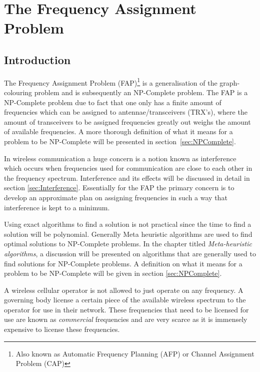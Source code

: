 \chapter{The Frequency Assignment Problem}
\label{chpt:fap}
\section{Introduction}
The Frequency Assignment Problem (FAP)\footnote{Also known as Automatic Frequency Planning (AFP) or Channel Assignment Problem (CAP)\cite{ACOvsEA}} is a generalisation of the graph-colouring problem and is subsequently an NP-Complete problem\cite{FAPRAMColouring}. The FAP is a NP-Complete problem due to fact that one only has a finite amount of frequencies which can be assigned to antennae/transceivers (TRX's), where the amount of transceivers to be assigned frequencies greatly out weighs the amount of available frequencies\cite{FAPRAMColouring}. A more thorough definition of what it means for a problem to be NP-Complete will be presented in section~\ref{sec:NPComplete}.

In wireless communication a huge concern is a notion known as interference which occurs when frequencies used for communication are close to each other in the frequency spectrum\cite{Karen2004}. Interference and its effects will be discussed in detail in section \ref{sec:Interference}. Essentially for the FAP the primary concern is to develop an approximate plan on assigning frequencies in such a way that interference is kept to a minimum. 

Using exact algorithms to find a solution is not practical since the time to find a solution will be polynomial. Generally Meta heuristic algorithms are used to find optimal solutions to NP-Complete problems\cite{ACOvsEA}. In the chapter titled \emph{Meta-heuristic algorithms}, a discussion will be presented on algorithms that are generally used to find solutions for NP-Complete problems. A definition on what it means for a problem to be NP-Complete will be given in section \ref{sec:NPComplete}. 

A wireless cellular operator is not allowed to just operate on any frequency. A governing body license a certain piece of the available wireless spectrum to the operator for use in their network\cite{FAPRAMColouring}. These frequencies that need to be licensed for use are known as \emph{commercial} frequencies and are very scarce as it is immensely expensive to license these frequencies\cite{FAPRAMColouring}. 

